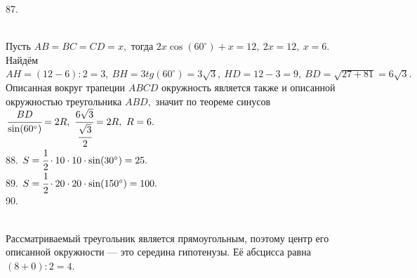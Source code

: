 \documentclass[12pt]{article}
\begin{document}
87. \begin{figure}[ht!]
\end{figure}\\
Пусть $AB=BC=CD=x,$ тогда $2x\cos(60^\circ)+x=12,\ 2x=12,\ x=6.$ Найдём $AH=(12-6):2=3,\ BH=3tg(60^\circ)=3\sqrt{3},\ HD=12-3=9,\ BD=\sqrt{27+81}=6\sqrt{3}.$ Описанная вокруг трапеции $ABCD$ окружность является также и описанной окружностью треугольника $ABD,$ значит по теореме синусов $\cfrac{BD}{\sin(60^\circ)}=2R,\ \cfrac{6\sqrt{3}}{\cfrac{\sqrt{3}}{2}}=2R,\ R=6.$\\
88. $S=\cfrac{1}{2}\cdot10\cdot10\cdot \sin(30^\circ)=25.$\\
89. $S=\cfrac{1}{2}\cdot20\cdot20\cdot \sin(150^\circ)=100.$\\
90. \begin{figure}[ht!]
\end{figure}\\
Рассматриваемый треугольник является прямоугольным, поэтому центр его описанной окружности --- это середина гипотенузы. Её абсцисса равна $(8+0):2=4.$\\
\end{document}
